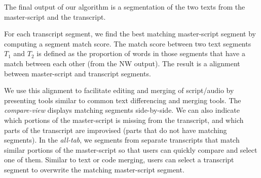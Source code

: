 The final output of our algorithm is a segmentation of the two texts from the master-script and the transcript. 

For each transcript segment, we find the best matching master-script segment by computing a segment match score. The match score between two text segments $T_1$ and $T_2$ is defined as the proportion of words in those segments that have a match between each other (from the NW output).
The result is a alignment between master-script and transcript segments. 

We use this alignment to facilitate editing and merging of script/audio by presenting tools similar to  common text differencing and merging tools. The \textit{compare-view} displays matching segments side-by-side. We can also indicate which portions of the master-script is missing from the transcript, and which parts of the transcript are improvised (parts that do not have matching segments). In the \textit{all-tab}, we segments from separate transcripts that match similar portions of the master-script so that users can quickly compare and select one of them. Similar to text or code merging, users can select a transcript segment to overwrite the matching master-script segment.

